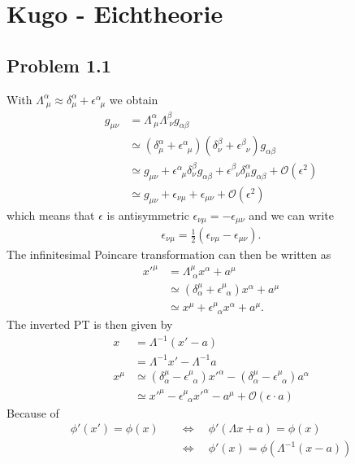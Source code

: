 \documentclass[../main.tex]{subfiles}
\begin{document}
\newpage
\section{{\sc Kugo} - Eichtheorie}
\subsection{Problem 1.1}
With $\Lambda^\alpha_{\;\mu}\approx\delta^\alpha_\mu+\epsilon^\alpha_{\;\;\mu}$ we obtain
\begin{align}
g_{\mu\nu}
&=\Lambda^\alpha_{\;\mu}\Lambda^\beta_{\;\nu}g_{\alpha\beta}\\
&\simeq\left(\delta^\alpha_\mu+\epsilon^\alpha_{\;\;\mu}\right)\left(\delta^\beta_\nu+\epsilon^\beta_{\;\;\nu}\right)g_{\alpha\beta}\\
&\simeq g_{\mu\nu}+\epsilon^\alpha_{\;\;\mu}\delta^\beta_\nu g_{\alpha\beta}+\epsilon^\beta_{\;\;\nu}\delta^\alpha_\mu g_{\alpha\beta}+\mathcal{O}(\epsilon^2)\\
&\simeq g_{\mu\nu}+\epsilon_{\nu\mu}+\epsilon_{\mu\nu}+\mathcal{O}(\epsilon^2)
\end{align}
which means that $\epsilon$ is antisymmetric $\epsilon_{\nu\mu}=-\epsilon_{\mu\nu}$ and we can write
\begin{align}
\epsilon_{\nu\mu}=\frac{1}{2}\left(\epsilon_{\nu\mu}-\epsilon_{\mu\nu}\right).
\end{align}
The infinitesimal Poincare transformation can then be written as
\begin{align}
x'^\mu
&=\Lambda^\mu_{\;\alpha}x^\alpha+a^\mu\\
&\simeq\left(\delta^\mu_\alpha+\epsilon^\mu_{\;\;\alpha}\right)x^\alpha+a^\mu\\
&\simeq x^\mu+\epsilon^\mu_{\;\;\alpha}x^\alpha+a^\mu.
\end{align}
The inverted PT is then given by
\begin{align}
x&=\Lambda^{-1}(x'-a)\\
&=\Lambda^{-1}x'-\Lambda^{-1}a\\
x^\mu&\simeq\left(\delta^\mu_\alpha-\epsilon^\mu_{\;\;\alpha}\right)x'^\alpha-\left(\delta^\mu_\alpha-\epsilon^\mu_{\;\;\alpha}\right)a^\alpha\\
&\simeq x'^\mu-\epsilon^\mu_{\;\;\alpha}x'^\alpha-a^\mu+\mathcal{O}(\epsilon\cdot a)
\end{align}
Because of 
\begin{align}
\phi'(x')=\phi(x)
&\quad\Leftrightarrow\quad\phi'(\Lambda x+a)=\phi(x)\\
&\quad\Leftrightarrow\quad\phi'(x)=\phi(\Lambda^{-1}(x-a))
\end{align}
\end{document}
